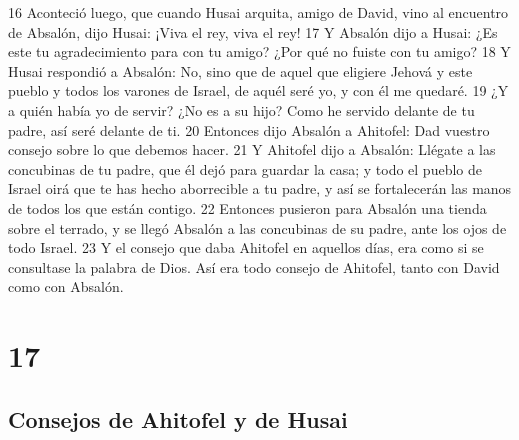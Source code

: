 16 Aconteció luego, que cuando Husai arquita, amigo de David, vino al encuentro de Absalón, dijo Husai: ¡Viva el rey, viva el rey!
17 Y Absalón dijo a Husai: ¿Es este tu agradecimiento para con tu amigo? ¿Por qué no fuiste con tu amigo?
18 Y Husai respondió a Absalón: No, sino que de aquel que eligiere Jehová y este pueblo y todos los varones de Israel, de aquél seré yo, y con él me quedaré.
19 ¿Y a quién había yo de servir? ¿No es a su hijo? Como he servido delante de tu padre, así seré delante de ti.
20 Entonces dijo Absalón a Ahitofel: Dad vuestro consejo sobre lo que debemos hacer.
21 Y Ahitofel dijo a Absalón: Llégate a las concubinas de tu padre, que él dejó para guardar la casa; y todo el pueblo de Israel oirá que te has hecho aborrecible a tu padre, y así se fortalecerán las manos de todos los que están contigo.
22 Entonces pusieron para Absalón una tienda sobre el terrado, y se llegó Absalón a las concubinas de su padre, ante los ojos de todo Israel. 
23 Y el consejo que daba Ahitofel en aquellos días, era como si se consultase la palabra de Dios. Así era todo consejo de Ahitofel, tanto con David como con Absalón.

\chapter{17}

\section*{Consejos de Ahitofel y de Husai}


